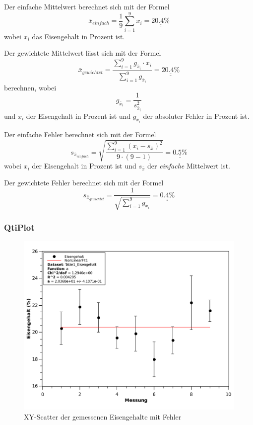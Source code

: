 Der einfache Mittelwert berechnet sich mit der Formel
\[ \bar{x}_{einfach} = \frac{1}{9} \sum_{i=1}^{9} x_i = \underline{\underline{20.4 \textrm{\%}}} \]
wobei $x_i$ das Eisengehalt in Prozent ist.

Der gewichtete Mittelwert l\"asst sich mit der Formel
\[ \bar{x}_{gewichtet} = \frac{ \sum_{i=1}^{9} g_{\bar{x}_i} \cdot x_i}{ \sum_{i=1}^{9} g_{\bar{x}_i}} = \underline{\underline{20.4 \textrm{\%}}} \]
berechnen, wobei
\[ g_{\bar{x}_i} = \frac{1}{s_{\bar{x}_i}^2} \]
und $x_i$ der Eisengehalt in Prozent ist und $g_{\bar{x}_i}$ der absoluter Fehler in Prozent ist.

Der einfache Fehler berechnet sich mit der Formel
\[ s_{\bar{x}_{einfach}} = \sqrt{ \frac{ \sum_{i=1}^{9} (x_i - s_{\bar{x}})^2}{ 9 \cdot (9-1) }} = \underline{\underline{0.5 \textrm{\%}}} \]
wobei $x_i$ der Eisengehalt in Prozent ist und $s_{\bar{x}}$ der \emph{einfache} Mittelwert ist.

Der gewichtete Fehler berechnet sich mit der Formel
\[ s_{\bar{x}_{gewichtet}} = \frac{1}{ \sqrt{ \sum_{i=1}^{9} g_{\bar{x}_i} } } = \underline{\underline{0.4 \textrm{\%}}}  \]


\subsubsection*{QtiPlot}

\begin{figure}[H]
    \center
    \includegraphics[width=.85\textwidth]{qtiplot/eisengehalt}
    \caption{XY-Scatter der gemessenen Eisengehalte mit Fehler}
    \label{fig:eisengehalt}
\end{figure}

